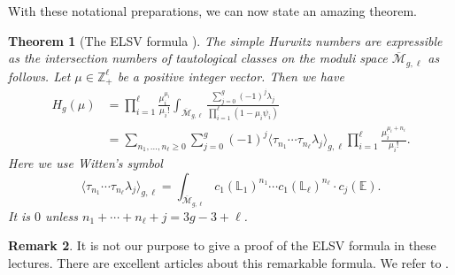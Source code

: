 \documentclass{amsart}
\newtheorem{thm}{Theorem}[section]
\theoremstyle{definition}
\newtheorem{rem}[thm]{Remark}
\numberwithin{equation}{section}
\numberwithin{figure}{section}
\newcommand{\Mbar}{{\overline{\mathcal{M}}}}
\newcommand{\bE}{{\mathbb{E}}}
\newcommand{\bL}{{\mathbb{L}}}
\newcommand{\bZ}{{\mathbb{Z}}}
\newcommand{\la}{{\langle}}
\newcommand{\ra}{{\rangle}}
\begin{document}
With these notational preparations, we can now 
state an amazing theorem.


\begin{thm}[The ELSV formula \cite{ELSV}]
The simple Hurwitz numbers are expressible as
the intersection numbers of tautological 
classes on the moduli space $\Mbar_{g,\ell}$ as
follows. Let $\mu\in \bZ_+ ^\ell$ be a
positive integer vector. Then we have
\begin{equation}
\begin{aligned}
\label{eq:ELSV}
H_g(\mu)
&= 
\prod_{i=1} ^\ell 
\frac{\mu_i ^{\mu_i}}{\mu_i !}
\int_{\Mbar_{g,\ell}}
\frac{\sum_{j=0} ^g  (-1)^j \lambda_j}
{\prod_{i=1} ^\ell (1-\mu_i\psi_i)}
\\
&=
\sum_{n_1,\dots,n_\ell \ge 0}
\sum_{j=0} ^g (-1)^j
\la \tau_{n_1}\cdots \tau_{n_\ell}\lambda_j
\ra_{g,\ell}
\prod_{i=1} ^\ell 
\frac{\mu_i ^{\mu_i+n_i}}{\mu_i !}.
\end{aligned}
\end{equation}
Here we use Witten's symbol
$$
\la \tau_{n_1}\cdots \tau_{n_\ell}\lambda_j
\ra_{g,\ell}
=
\int_{\Mbar_{g,\ell}}
c_1(\bL_1) ^{n_1}\cdots
c_1(\bL_\ell) ^{n_\ell}\cdot
c_j(\bE).
$$
It is $0$ unless $n_1+\cdots+n_\ell + j = 3g-3+\ell$.
\end{thm}

\begin{rem}
It is not our purpose to give a proof of the
ELSV formula in these lectures. There are excellent
articles  about this remarkable 
formula. We refer to \cite{Liu2, OP1}.
\end{rem}
\end{document}
